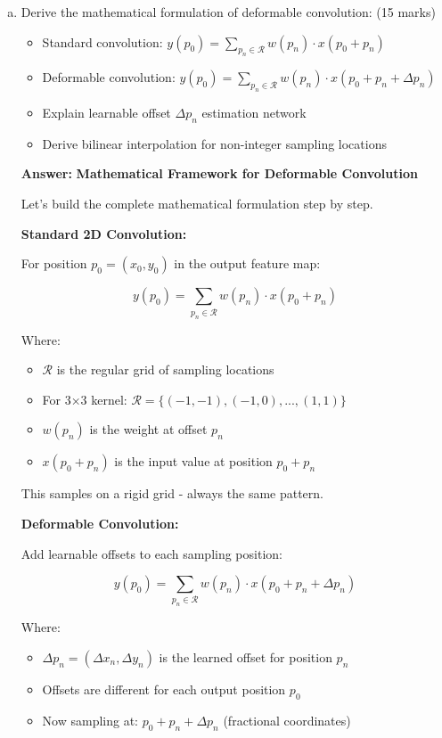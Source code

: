 \documentclass[12pt]{article}
\newcommand{\answer}[1]{{\color{answercolor}\textbf{Answer:} #1}}
\newcommand{\explanation}[1]{{\color{explanationcolor}#1}}
\begin{document}
\begin{enumerate}[(a)]
    \item Derive the mathematical formulation of deformable convolution: \hfill (15 marks)
    \begin{itemize}
        \item Standard convolution: $y(p_0) = \sum_{p_n \in \mathcal{R}} w(p_n) \cdot x(p_0 + p_n)$
        \item Deformable convolution: $y(p_0) = \sum_{p_n \in \mathcal{R}} w(p_n) \cdot x(p_0 + p_n + \Delta p_n)$
        \item Explain learnable offset $\Delta p_n$ estimation network
        \item Derive bilinear interpolation for non-integer sampling locations
    \end{itemize}
    
    \answer{
    \textbf{Mathematical Framework for Deformable Convolution}
    
    \explanation{
    Let's build the complete mathematical formulation step by step.
    }
    
    \textbf{Standard 2D Convolution:}
    
    \explanation{
    For position $p_0 = (x_0, y_0)$ in the output feature map:
    
    \[y(p_0) = \sum_{p_n \in \mathcal{R}} w(p_n) \cdot x(p_0 + p_n)\]
    
    Where:
    \begin{itemize}
        \item $\mathcal{R}$ is the regular grid of sampling locations
        \item For 3×3 kernel: $\mathcal{R} = \{(-1,-1), (-1,0), ..., (1,1)\}$
        \item $w(p_n)$ is the weight at offset $p_n$
        \item $x(p_0 + p_n)$ is the input value at position $p_0 + p_n$
    \end{itemize}
    
    This samples on a rigid grid - always the same pattern.
    }
    
    \textbf{Deformable Convolution:}
    
    \explanation{
    Add learnable offsets to each sampling position:
    
    \[y(p_0) = \sum_{p_n \in \mathcal{R}} w(p_n) \cdot x(p_0 + p_n + \Delta p_n)\]
    
    Where:
    \begin{itemize}
        \item $\Delta p_n = (\Delta x_n, \Delta y_n)$ is the learned offset for position $p_n$
        \item Offsets are different for each output position $p_0$
        \item Now sampling at: $p_0 + p_n + \Delta p_n$ (fractional coordinates)
    \end{itemize}
    }
    
}
\end{enumerate}
\end{document}
